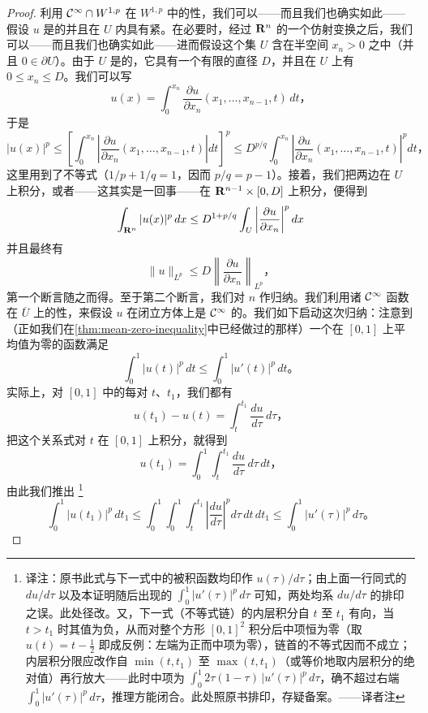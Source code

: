 \begin{proof}
利用 $\mathcal{C}^{\infty}\cap W^{1,p}$ 在 $W^{1,p}$ 中的\trDense{}性，我们可以——而且我们也确实如此——假设 $u$ 是\trSmooth{}的并且在 $U$ 内具有紧\trSupport{}。在必要时，经过 $\mathbf{R}^{n}$ 的一个仿射变换之后，我们可以——而且我们也确实如此——进而假设这个\trOpen{}集 $U$ 含在半空间 $x_{n}>0$ 之中（并且 $0\in\partial U$）。由于 $U$ 是\trBounded{}的，它具有一个有限的直径 $D$，并且在 $U$ 上有 $0\le x_{n}\le D$。我们可以写
\[
u(x)=\int_{0}^{x_{n}}\frac{\partial u}{\partial x_{n}}(x_{1},\dotsc,x_{n-1},t)\,dt\text{，}
\]
于是
\[
|u(x)|^{p}
\le\left[\int_{0}^{x_{n}}\left|\frac{\partial u}{\partial x_{n}}(x_{1},\dotsc,x_{n-1},t)\right|dt\right]^{p}
\le D^{p/q}\int_{0}^{x_{n}}\left|\frac{\partial u}{\partial x_{n}}(x_{1},\dotsc,x_{n-1},t)\right|^{p}dt\text{，}
\]
这里用到了\trHoelder{}不等式（$1/p+1/q=1$，因而 $p/q=p-1$）。接着，我们把两边在 $U$ 上积分，或者——这其实是一回事——在 $\mathbf{R}^{n-1}\times[0,D]$ 上积分，便得到
\[
\int_{\mathbf{R}^{n}}|u(x)|^{p}\,dx\le D^{1+p/q}\int_{U}\left|\frac{\partial u}{\partial x_{n}}\right|^{p}dx
\]
并且最终有
\[
\|u\|_{L^{p}}\le D\left\|\frac{\partial u}{\partial x_{n}}\right\|_{L^{p}}\text{，}
\]
第一个断言随之而得。至于第二个断言，我们对 $n$ 作归纳。我们利用诸 $\mathcal{C}^{\infty}$ 函数在 $\overline{U}$ 上的\trDense{}性，来假设 $u$ 在闭立方体上是 $\mathcal{C}^{\infty}$ 的。我们如下启动这次归纳：注意到（正如我们在\cref{thm:mean-zero-inequality}中已经做过的那样）一个在 $[0,1]$ 上平均值为零的函数满足
\[
\int_{0}^{1}|u(t)|^{p}\,dt\le\int_{0}^{1}|u'(t)|^{p}\,dt\text{。}
\]
实际上，对 $[0,1]$ 中的每对 $t$、$t_{1}$，我们都有
\[
u(t_{1})-u(t)=\int_{t}^{t_{1}}\frac{du}{d\tau}\,d\tau\text{，}
\]
把这个关系式对 $t$ 在 $[0,1]$ 上积分，就得到
\[
u(t_{1})=\int_{0}^{1}\int_{t}^{t_{1}}\frac{du}{d\tau}\,d\tau\,dt\text{，}
\]
由此我们推出%
\footnote{译注：原书此式与下一式中的被积函数均印作 $u(\tau)/d\tau$；由上面一行同式的 $du/d\tau$ 以及本证明随后出现的 $\int_{0}^{1}|u'(\tau)|^{p}\,d\tau$ 可知，两处均系 $du/d\tau$ 的排印之误。此处径改。又，下一式（不等式链）的内层积分自 $t$ 至 $t_{1}$ 有向，当 $t>t_{1}$ 时其值为负，从而对整个方形 $[0,1]^{2}$ 积分后中项恒为零（取 $u(t)=t-\frac{1}{2}$ 即成反例：左端为正而中项为零），链首的不等式因而不成立；内层积分限应改作自 $\min(t,t_{1})$ 至 $\max(t,t_{1})$（或等价地取内层积分的绝对值）再行放大——此时中项为 $\int_{0}^{1}2\tau(1-\tau)\,|u'(\tau)|^{p}\,d\tau$，确不超过右端 $\int_{0}^{1}|u'(\tau)|^{p}\,d\tau$，推理方能闭合。此处照原书排印，存疑备案。——译者注}
\[
\int_{0}^{1}|u(t_{1})|^{p}\,dt_{1}
\le\int_{0}^{1}\int_{0}^{1}\int_{t}^{t_{1}}\left|\frac{du}{d\tau}\right|^{p}d\tau\,dt\,dt_{1}
\le\int_{0}^{1}|u'(\tau)|^{p}\,d\tau\text{。}
\]
\end{proof}
